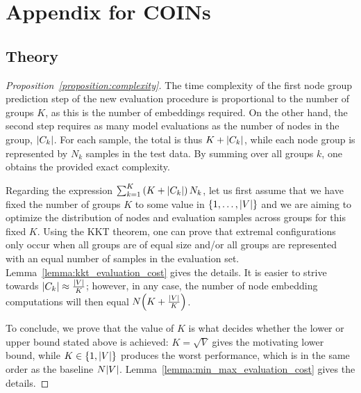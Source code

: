 \appendix
\chapter{Appendix for COINs}

\section{Theory}
\label{sec:appendix_proofs}

\begin{proof}[Proposition~\ref{proposition:complexity}]
    The time complexity of the first node group prediction step of the new evaluation procedure is proportional to the number of groups $K$, as this is the number of embeddings required. On the other hand, the second step requires as many model evaluations as the number of nodes in the group, $\mathopen{}\left|C_k\right|$. For each sample, the total is thus $K+\mathopen{}\left|C_k\right|$, while each node group is represented by $N_k$ samples in the test data. By summing over all groups $k$, one obtains the provided exact complexity.

    Regarding the expression $\sum_{k=1}^{K}{\mathopen{}\left(K+\mathopen{}\left|C_k\right|\right)N_k}$, let us first assume that we have fixed the number of groups $K$ to some value in $\mathopen{}\left\{1,\dots,\mathopen{}\left|V\right|\right\}$ and we are aiming to optimize the distribution of nodes and evaluation samples across groups for this fixed $K$. Using the KKT theorem, one can prove that extremal configurations only occur when all groups are of equal size and/or all groups are represented with an equal number of samples in the evaluation set. Lemma~\ref{lemma:kkt_evaluation_cost} gives the details. It is easier to strive towards $\mathopen{}\left|C_k\right| \approx \frac{\mathopen{}\left|V\right|}{K}$; however, in any case, the number of node embedding computations will then equal $N\mathopen{}\left(K + \frac{\mathopen{}\left|V\right|}{K}\right)$. 
    
    To conclude, we prove that the value of $K$ is what decides whether the lower or upper bound stated above is achieved: $K=\sqrt{V}$ gives the motivating lower bound, while $K \in \mathopen{}\left\{1, \mathopen{}\left|V\right|\right\}$ produces the worst performance, which is in the same order as the baseline $N \mathopen{}\left|V\right|$. Lemma~\ref{lemma:min_max_evaluation_cost} gives the details.
\end{proof}


